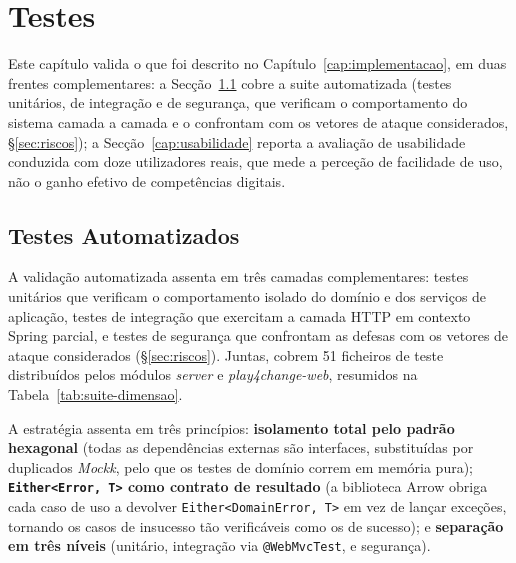 %
%
\chapter{Testes} \label{cap:testes-geral}

Este capítulo valida o que foi descrito no Capítulo~\ref{cap:implementacao}, em duas frentes complementares: a Secção~\ref{cap:testes} cobre a suite automatizada (testes unitários, de integração e de segurança, que verificam o comportamento do sistema camada a camada e o confrontam com os vetores de ataque considerados, §\ref{sec:riscos}); a Secção~\ref{cap:usabilidade} reporta a avaliação de usabilidade conduzida com doze utilizadores reais, que mede a perceção de facilidade de uso, não o ganho efetivo de competências digitais.

\section{Testes Automatizados} \label{cap:testes} \label{sec:estrategia-testes}

A validação automatizada assenta em três camadas complementares: testes unitários que verificam o comportamento isolado do domínio e dos serviços de aplicação, testes de integração que exercitam a camada HTTP em contexto Spring parcial, e testes de segurança que confrontam as defesas com os vetores de ataque considerados (§\ref{sec:riscos}). Juntas, cobrem 51 ficheiros de teste distribuídos pelos módulos \textit{server} e \textit{play4change-web}, resumidos na Tabela~\ref{tab:suite-dimensao}.

A estratégia assenta em três princípios: \textbf{isolamento total pelo padrão hexagonal} (todas as dependências externas são interfaces, substituídas por duplicados \textit{Mockk}, pelo que os testes de domínio correm em memória pura); \textbf{\texttt{Either<Error,~T>} como contrato de resultado} (a biblioteca Arrow obriga cada caso de uso a devolver \texttt{Either<DomainError,~T>} em vez de lançar exceções, tornando os casos de insucesso tão verificáveis como os de sucesso); e \textbf{separação em três níveis} (unitário, integração via \texttt{@WebMvcTest}, e segurança).

